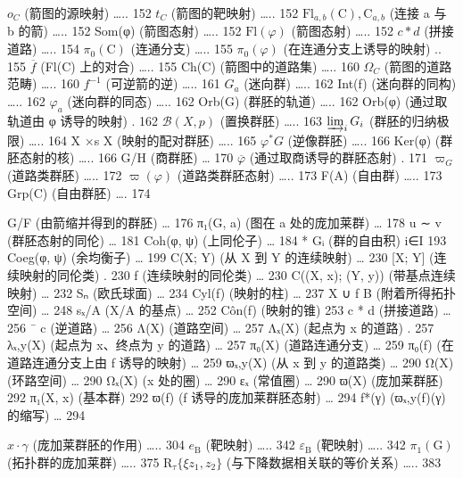  \(o_{C}\) (箭图的源映射) \ldots.. 152 \(t_{C}\) (箭图的靶映射) \ldots.. 152 \(\mathrm{Fl}_{a,b}(\mathrm{C}), \mathrm{C}_{a,b}\) (连接 a 与 b 的箭) \ldots.. 152 Som(φ) (箭图态射) \ldots.. 152 \(\mathrm{Fl}(\varphi)\) (箭图态射) \ldots.. 152 \(c*d\) (拼接道路) \ldots.. 154 \(\pi_{0}(\mathrm{C})\) (连通分支) \ldots.. 155 \(\pi_{0}(\varphi)\) (在连通分支上诱导的映射) .. 155 \(\overline{f}\) (Fl(C) 上的对合) \ldots.. 155 Ch(C) (箭图中的道路集) \ldots.. 160 \(\Omega_{C}\) (箭图的道路范畴) \ldots.. 160 \(f^{-1}\) (可逆箭的逆) \ldots.. 161 \(G_{a}\) (迷向群) \ldots.. 162 Int(f) (迷向群的同构) \ldots.. 162 \(\varphi_{a}\) (迷向群的同态) \ldots.. 162 Orb(G) (群胚的轨道) \ldots.. 162 Orb(φ) (通过取轨道由 φ 诱导的映射) . 162 \(\mathcal{B}(X,p)\) (置换群胚) \ldots.. 163 \(\varinjlim_{i}G_{i}\) (群胚的归纳极限) \ldots.. 164 X ×s X (映射的配对群胚) \ldots.. 165 \(\varphi^{*}G\) (逆像群胚) \ldots.. 166 Ker(φ) (群胚态射的核) \ldots.. 166 G/H (商群胚) \ldots{} 170 \(\overline{\varphi}\) (通过取商诱导的群胚态射) . 171 \(\varpi_{G}\) (道路类群胚) \ldots.. 172 \(\varpi(\varphi)\) (道路类群胚态射) \ldots.. 173 F(A) (自由群) \ldots.. 173 Grp(C) (自由群胚) \ldots. 174

G/F (由箭缩并得到的群胚) \ldots{} 176 π₁(G, a) (图在 a 处的庞加莱群) \ldots{} 178 u ∼ v (群胚态射的同伦) \ldots{} 181 Coh(φ, ψ) (上同伦子) \ldots{} 184 * Gᵢ (群的自由积) i∈I 193 Coeg(φ, ψ) (余均衡子) \ldots{} 199 C(X; Y) (从 X 到 Y 的连续映射) \ldots{} 230 {[}X; Y{]} (连续映射的同伦类) . 230 f (连续映射的同伦类) \ldots{} 230 C((X, x); (Y, y)) (带基点连续映射) \ldots{} 232 Sₙ (欧氏球面) \ldots{} 234 Cyl(f) (映射的柱) \ldots{} 237 X ∪ f B (附着所得拓扑空间) \ldots{} 248 sₓ/A (X/A 的基点) \ldots{} 252 Côn(f) (映射的锥) 253 c * d (拼接道路) \ldots{} 256 ¯ c (逆道路) \ldots{} 256 Λ(X) (道路空间) \ldots{} 257 Λₓ(X) (起点为 x 的道路) . 257 λₓ,y(X) (起点为 x、终点为 y 的道路) \ldots{} 257 π₀(X) (道路连通分支) \ldots{} 259 π₀(f) (在道路连通分支上由 f 诱导的映射) \ldots{} 259 ϖₓ,y(X) (从 x 到 y 的道路类) \ldots{} 290 Ω(X) (环路空间) \ldots{} 290 Ωₓ(X) (x 处的圈) \ldots{} 290 εₓ (常值圈) \ldots{} 290 ϖ(X) (庞加莱群胚) 292 π₁(X, x) (基本群) 292 ϖ(f) (f 诱导的庞加莱群胚态射) \ldots{} 294 f*(γ) (ϖₓ,y(f)(γ) 的缩写) \ldots{} 294

 \(x \cdot \gamma\) (庞加莱群胚的作用) \ldots.. 304 \(e_{\mathrm{B}}\) (靶映射) \ldots.. 342 \(\varepsilon_{\mathrm{B}}\) (靶映射) \ldots.. 342 \(\pi_{1}(\mathrm{G})\) (拓扑群的庞加莱群) \ldots.. 375 \(\mathrm{R}_{\tau} \{\xi z_{1}, z_{2}\}\) (与下降数据相关联的等价关系) \ldots.. 383

